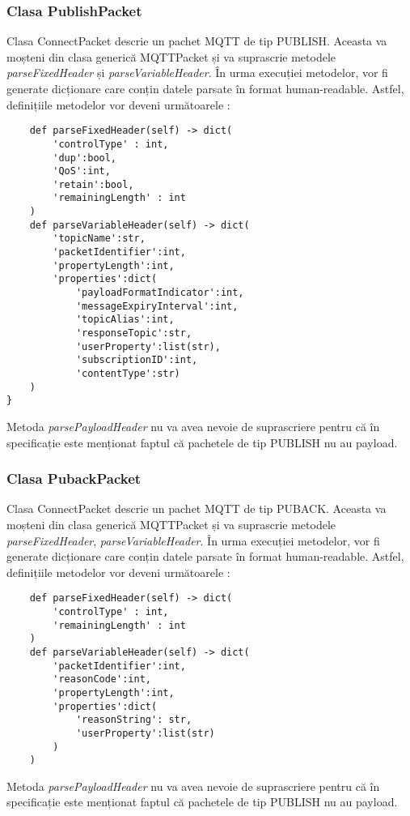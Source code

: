 \documentclass{report}
\begin{document}
\subsubsection{Clasa PublishPacket}
Clasa ConnectPacket descrie un pachet MQTT de tip PUBLISH. Aceasta va moșteni din clasa generică MQTTPacket și va suprascrie metodele \emph{parseFixedHeader} și \emph{parseVariableHeader}.
În urma execuției metodelor, vor fi generate dicționare care conțin datele parsate în format human-readable.
Astfel, definițiile metodelor vor deveni următoarele : 
\\
\begin{verbatim}
	def parseFixedHeader(self) -> dict(
		'controlType' : int, 
		'dup':bool, 
		'QoS':int, 
		'retain':bool, 
		'remainingLength' : int
	)
	def parseVariableHeader(self) -> dict(
		'topicName':str, 
		'packetIdentifier':int, 
		'propertyLength':int, 
		'properties':dict(
			'payloadFormatIndicator':int, 
			'messageExpiryInterval':int, 
			'topicAlias':int, 
			'responseTopic':str, 
			'userProperty':list(str), 
			'subscriptionID':int, 
			'contentType':str)
	)
}
\end{verbatim}
Metoda \emph{parsePayloadHeader} nu va avea nevoie de suprascriere pentru că în specificație este menționat faptul că pachetele de tip PUBLISH nu au payload.
\subsubsection{Clasa PubackPacket}
Clasa ConnectPacket descrie un pachet MQTT de tip PUBACK. Aceasta va moșteni din clasa generică MQTTPacket și va suprascrie metodele \emph{parseFixedHeader}, \emph{parseVariableHeader}.
În urma execuției metodelor, vor fi generate dicționare care conțin datele parsate în format human-readable.
Astfel, definițiile metodelor vor deveni următoarele : 
\\
\begin{verbatim}
	def parseFixedHeader(self) -> dict(
		'controlType' : int, 
		'remainingLength' : int
	)
	def parseVariableHeader(self) -> dict(
		'packetIdentifier':int, 
		'reasonCode':int, 
		'propertyLength':int, 
		'properties':dict(
			'reasonString': str, 
			'userProperty':list(str)
		)
	)
\end{verbatim}
Metoda \emph{parsePayloadHeader} nu va avea nevoie de suprascriere pentru că în specificație este menționat faptul că pachetele de tip PUBLISH nu au payload.
\end{document}
